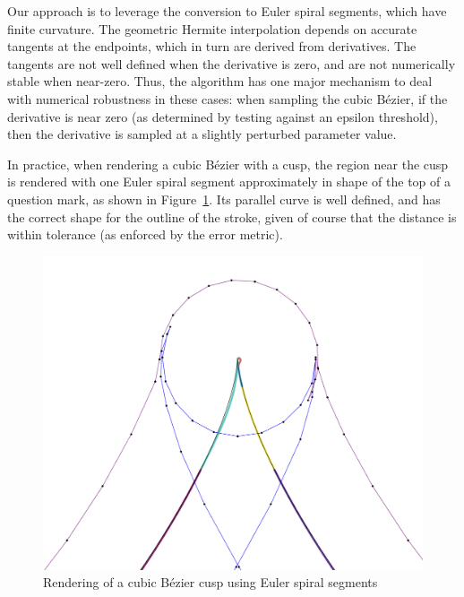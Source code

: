 \documentclass[sigconf]{acmart}
\begin{document}
Our approach is to leverage the conversion to Euler spiral segments, which have finite curvature. The geometric Hermite interpolation depends on accurate tangents at the endpoints, which in turn are derived from derivatives. The tangents are not well defined when the derivative is zero, and are not numerically stable when near-zero. Thus, the algorithm has one major mechanism to deal with numerical robustness in these cases: when sampling the cubic Bézier, if the derivative is near zero (as determined by testing against an epsilon threshold), then the derivative is sampled at a slightly perturbed parameter value.

In practice, when rendering a cubic Bézier with a cusp, the region near the cusp is rendered with one Euler spiral segment approximately in shape of the top of a question mark, as shown in Figure~\ref{fig:cusp_rendering}. Its parallel curve is well defined, and has the correct shape for the outline of the stroke, given of course that the distance is within tolerance (as enforced by the error metric).


\begin{figure}
    \includegraphics[scale=0.24]{cusp_rendering}
    \caption{Rendering of a cubic Bézier cusp using Euler spiral segments}
    \label{fig:cusp_rendering}
\end{figure}
\end{document}
